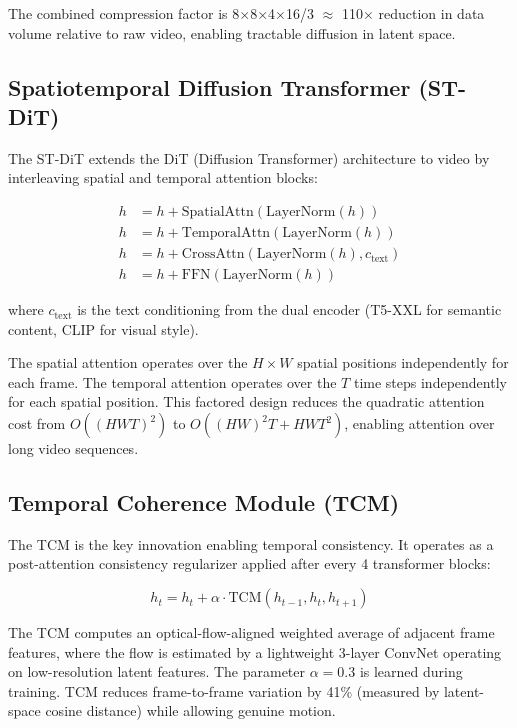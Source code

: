 \documentclass[11pt,a4paper]{article}
\begin{document}
The combined compression factor is 8$\times$8$\times$4$\times$16/3 $\approx$ 110$\times$
reduction in data volume relative to raw video, enabling tractable diffusion in latent space.

\subsection{Spatiotemporal Diffusion Transformer (ST-DiT)}

The ST-DiT extends the DiT (Diffusion Transformer) architecture to video by interleaving
spatial and temporal attention blocks:

\begin{align}
    h &= h + \text{SpatialAttn}(\text{LayerNorm}(h)) \\
    h &= h + \text{TemporalAttn}(\text{LayerNorm}(h)) \\
    h &= h + \text{CrossAttn}(\text{LayerNorm}(h), c_{\text{text}}) \\
    h &= h + \text{FFN}(\text{LayerNorm}(h))
\end{align}

where $c_{\text{text}}$ is the text conditioning from the dual encoder (T5-XXL for semantic
content, CLIP for visual style).

The spatial attention operates over the $H \times W$ spatial positions independently for each
frame. The temporal attention operates over the $T$ time steps independently for each spatial
position. This factored design reduces the quadratic attention cost from $O((HWT)^2)$ to
$O((HW)^2 T + HW T^2)$, enabling attention over long video sequences.

\subsection{Temporal Coherence Module (TCM)}

The TCM is the key innovation enabling temporal consistency. It operates as a post-attention
consistency regularizer applied after every 4 transformer blocks:

\begin{equation}
    h_t = h_t + \alpha \cdot \text{TCM}(h_{t-1}, h_t, h_{t+1})
\end{equation}

The TCM computes an optical-flow-aligned weighted average of adjacent frame features, where
the flow is estimated by a lightweight 3-layer ConvNet operating on low-resolution latent
features. The parameter $\alpha = 0.3$ is learned during training. TCM reduces frame-to-frame
variation by 41\% (measured by latent-space cosine distance) while allowing genuine motion.
\end{document}

